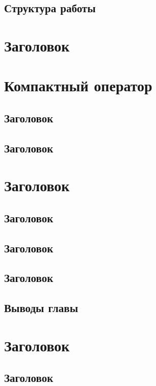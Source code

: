 \documentclass[openany]{book}
\theoremstyle{definition}
\begin{document}
\section{Структура работы}



\chapter{Заголовок}    %
\pagestyle{fancy}


\chapter{Компактный оператор}
\pagestyle{fancy}


\section{Заголовок}




\section{Заголовок}


\chapter{Заголовок}
\pagestyle{fancy}
\section{Заголовок}

\section{Заголовок}


\section{Заголовок}


\section{Выводы главы}


\chapter{Заголовок}
\pagestyle{fancy}


\section{Заголовок}
\end{document}
